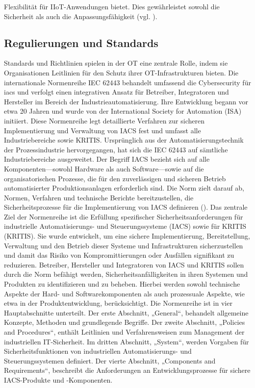 Flexibilität für IIoT-Anwendungen bietet. Dies gewährleistet sowohl die Sicherheit als auch die Anpassungsfähigkeit (vgl. \cite{securityInsider}).



\subsection{Regulierungen und Standards}
Standards und Richtlinien spielen in der OT eine zentrale Rolle, indem sie Organisationen Leitlinien für den Schutz ihrer OT-Infrastrukturen bieten. Die internationale Normenreihe IEC 62443 behandelt umfassend die Cybersecurity für \ac{iacs} und verfolgt einen integrativen Ansatz für Betreiber, Integratoren und Hersteller im Bereich der Industrieautomatisierung. Ihre Entwicklung begann vor etwa 20 Jahren und wurde von der International Society for Automation (ISA) initiiert. Diese Normenreihe legt detaillierte Verfahren zur sicheren Implementierung und Verwaltung von IACS fest und umfasst alle Industriebereiche sowie KRITIS. Ursprünglich aus der Automatisierungstechnik der Prozessindustrie hervorgegangen, hat sich die IEC 62443 auf sämtliche Industriebereiche ausgeweitet. Der Begriff IACS bezieht sich auf alle Komponenten—sowohl Hardware als auch Software—sowie auf die organisatorischen Prozesse, die für den zuverlässigen und sicheren Betrieb automatisierter Produktionsanlagen erforderlich sind. Die Norm zielt darauf ab, Normen, Verfahren und technische Berichte bereitzustellen, die Sicherheitsprozesse für die Implementierung von IACS definieren (\cite{DKE}). Das zentrale Ziel der Normenreihe ist die Erfüllung spezifischer Sicherheitsanforderungen für industrielle Automatisierungs- und Steuerungssysteme (IACS) sowie für KRITIS (KRITIS). Sie wurde entwickelt, um eine sichere Implementierung, Bereitstellung, Verwaltung und den Betrieb dieser Systeme und Infrastrukturen sicherzustellen und damit das Risiko von Kompromittierungen oder Ausfällen signifikant zu reduzieren. Betreiber, Hersteller und Integratoren von IACS und KRITIS sollen durch die Norm befähigt werden, Sicherheitsanfälligkeiten in ihren Systemen und Produkten zu identifizieren und zu beheben. Hierbei werden sowohl technische Aspekte der Hard- und Softwarekomponenten als auch prozessuale Aspekte, wie etwa in der Produktentwicklung, berücksichtigt.
Die Normenreihe ist in vier Hauptabschnitte unterteilt. Der erste Abschnitt, „General“, behandelt allgemeine Konzepte, Methoden und grundlegende Begriffe. Der zweite Abschnitt, „Policies and Procedures“, enthält Leitlinien und Verfahrensweisen zum Management der industriellen IT-Sicherheit. Im dritten Abschnitt, „System“, werden Vorgaben für Sicherheitsfunktionen von industriellen Automatisierungs- und Steuerungssystemen definiert. Der vierte Abschnitt, „Components and Requirements“, beschreibt die Anforderungen an Entwicklungsprozesse für sichere IACS-Produkte und -Komponenten.
